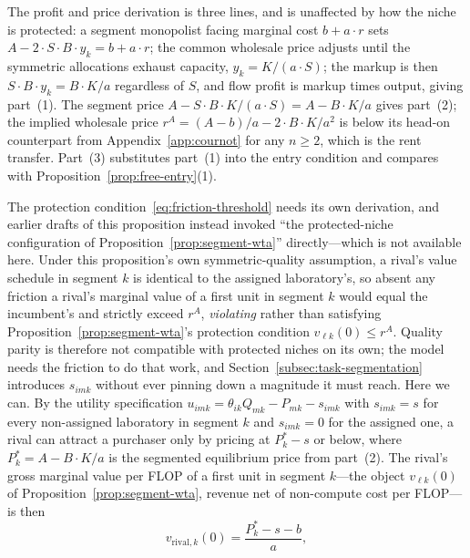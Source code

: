 \documentclass[11pt]{article}
\begin{document}
The profit and price derivation is three lines, and is unaffected by how the niche is protected: a segment monopolist facing marginal cost $b+a\cdot r$ sets $A-2\cdot S\cdot B\cdot y_k=b+a\cdot r$; the common wholesale price adjusts until the symmetric allocations exhaust capacity, $y_k=K/(a\cdot S)$; the markup is then $S\cdot B\cdot y_k=B\cdot K/a$ regardless of $S$, and flow profit is markup times output, giving part~(1). The segment price $A-S\cdot B\cdot K/(a\cdot S)=A-B\cdot K/a$ gives part~(2); the implied wholesale price $r^{A}=(A-b)/a-2\cdot B\cdot K/a^{2}$ is below its head-on counterpart from Appendix~\ref{app:cournot} for any $n\geq2$, which is the rent transfer. Part~(3) substitutes part~(1) into the entry condition and compares with Proposition~\ref{prop:free-entry}(1).

The protection condition~\eqref{eq:friction-threshold} needs its own derivation, and earlier drafts of this proposition instead invoked ``the protected-niche configuration of Proposition~\ref{prop:segment-wta}'' directly---which is not available here. Under this proposition's own symmetric-quality assumption, a rival's value schedule in segment $k$ is identical to the assigned laboratory's, so absent any friction a rival's marginal value of a first unit in segment $k$ would equal the incumbent's and strictly exceed $r^A$, \emph{violating} rather than satisfying Proposition~\ref{prop:segment-wta}'s protection condition $v_{\ell k}(0)\leq r^A$. Quality parity is therefore not compatible with protected niches on its own; the model needs the friction to do that work, and Section~\ref{subsec:task-segmentation} introduces $s_{imk}$ without ever pinning down a magnitude it must reach. Here we can. By the utility specification $u_{imk}=\theta_{ik}Q_{mk}-P_{mk}-s_{imk}$ with $s_{imk}=s$ for every non-assigned laboratory in segment $k$ and $s_{imk}=0$ for the assigned one, a rival can attract a purchaser only by pricing at $P_k^*-s$ or below, where $P_k^*=A-B\cdot K/a$ is the segmented equilibrium price from part~(2). The rival's gross marginal value per FLOP of a first unit in segment $k$---the object $v_{\ell k}(0)$ of Proposition~\ref{prop:segment-wta}, revenue net of non-compute cost per FLOP---is then
\begin{equation}v_{\mathrm{rival},k}(0)=\frac{P_k^*-s-b}{a},\end{equation}
\end{document}
